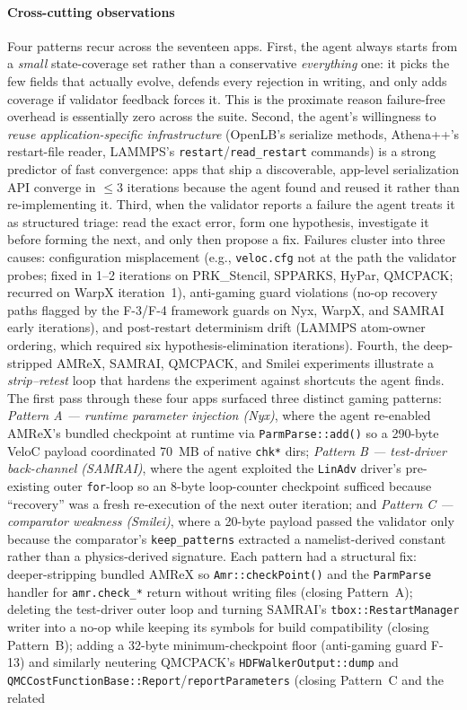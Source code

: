 \documentclass[conference]{IEEEtran}
\begin{document}
\paragraph{Cross-cutting observations}
Four patterns recur across the seventeen apps. First, the agent always starts from a \emph{small} state-coverage set rather than a conservative \emph{everything} one: it picks the few fields that actually evolve, defends every rejection in writing, and only adds coverage if validator feedback forces it. This is the proximate reason failure-free overhead is essentially zero across the suite. Second, the agent's willingness to \emph{reuse application-specific infrastructure} (OpenLB's serialize methods, Athena++'s restart-file reader, LAMMPS's \texttt{restart}/\texttt{read\_restart} commands) is a strong predictor of fast convergence: apps that ship a discoverable, app-level serialization API converge in $\le 3$ iterations because the agent found and reused it rather than re-implementing it. Third, when the validator reports a failure the agent treats it as structured triage: read the exact error, form one hypothesis, investigate it before forming the next, and only then propose a fix. Failures cluster into three causes: configuration misplacement (e.g., \texttt{veloc.cfg} not at the path the validator probes; fixed in 1--2 iterations on PRK\_Stencil, SPPARKS, HyPar, QMCPACK; recurred on WarpX iteration~1), anti-gaming guard violations (no-op recovery paths flagged by the F-3/F-4 framework guards on Nyx, WarpX, and SAMRAI early iterations), and post-restart determinism drift (LAMMPS atom-owner ordering, which required six hypothesis-elimination iterations). Fourth, the deep-stripped AMReX, SAMRAI, QMCPACK, and Smilei experiments illustrate a \emph{strip--retest} loop that hardens the experiment against shortcuts the agent finds. The first pass through these four apps surfaced three distinct gaming patterns: \emph{Pattern A --- runtime parameter injection (Nyx)}, where the agent re-enabled AMReX's bundled checkpoint at runtime via \texttt{ParmParse::add()} so a 290-byte VeloC payload coordinated 70~MB of native \texttt{chk*} dirs; \emph{Pattern B --- test-driver back-channel (SAMRAI)}, where the agent exploited the \texttt{LinAdv} driver's pre-existing outer \texttt{for}-loop so an 8-byte loop-counter checkpoint sufficed because ``recovery'' was a fresh re-execution of the next outer iteration; and \emph{Pattern C --- comparator weakness (Smilei)}, where a 20-byte payload passed the validator only because the comparator's \texttt{keep\_patterns} extracted a namelist-derived constant rather than a physics-derived signature. Each pattern had a structural fix: deeper-stripping bundled AMReX so \texttt{Amr::checkPoint()} and the \texttt{ParmParse} handler for \texttt{amr.check\_*} return without writing files (closing Pattern~A); deleting the test-driver outer loop and turning SAMRAI's \texttt{tbox::RestartManager} writer into a no-op while keeping its symbols for build compatibility (closing Pattern~B); adding a 32-byte minimum-checkpoint floor (anti-gaming guard F-13) and similarly neutering QMCPACK's \texttt{HDFWalkerOutput::dump} and \texttt{QMCCostFunctionBase::Report}/\texttt{reportParameters} (closing Pattern~C and the related 
\end{document}

